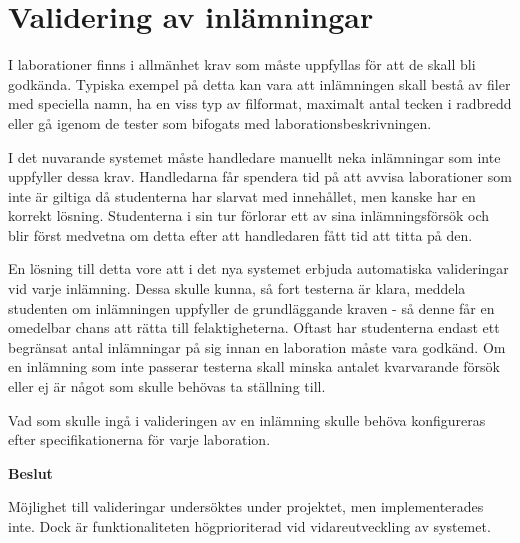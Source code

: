 \section{Validering av inlämningar}\label{sec:valideringar}

I laborationer finns i allmänhet krav som måste uppfyllas för att de skall bli godkända. Typiska exempel på detta kan vara att inlämningen skall bestå av filer med speciella namn, ha en viss typ av filformat, maximalt antal tecken i radbredd eller gå igenom de tester som bifogats med laborationsbeskrivningen.

I det nuvarande systemet måste handledare manuellt neka inlämningar som inte uppfyller dessa krav. Handledarna får spendera tid på att avvisa laborationer som inte är giltiga då studenterna har slarvat med innehållet, men kanske har en korrekt lösning. Studenterna i sin tur förlorar ett av sina inlämningsförsök och blir först medvetna om detta efter att handledaren fått tid att titta på den.

En lösning till detta vore att i det nya systemet erbjuda automatiska valideringar vid varje inlämning. Dessa skulle kunna, så fort testerna är klara, meddela studenten om inlämningen uppfyller de grundläggande kraven - så denne får en omedelbar chans att rätta till felaktigheterna. Oftast har studenterna endast ett begränsat antal inlämningar på sig innan en laboration måste vara godkänd. Om en inlämning som inte passerar testerna skall minska antalet kvarvarande försök eller ej är något som skulle behövas ta ställning till.

Vad som skulle ingå i valideringen av en inlämning skulle behöva konfigureras efter specifikationerna för varje laboration. 

\begin{flushright}
  
  \textbf{Beslut}
  
  Möjlighet till valideringar undersöktes under projektet, men implementerades inte. Dock är funktionaliteten högprioriterad vid vidareutveckling av systemet.
  
\end{flushright}